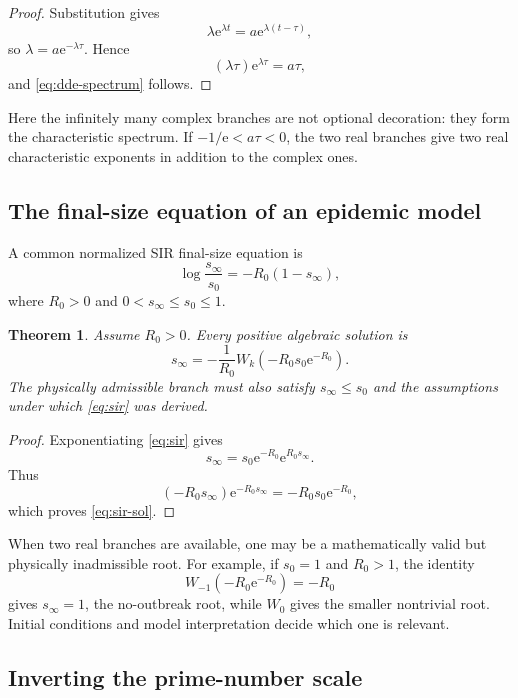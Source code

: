 \documentclass[11pt]{article}
\newtheorem{theorem}{Theorem}[section]
\theoremstyle{remark}
\newcommand{\ee}{\mathrm e}
\begin{document}
\begin{proof}
Substitution gives
\[
       \lambda\ee^{\lambda t}
       =a\ee^{\lambda(t-\tau)},
\]
so \(\lambda=a\ee^{-\lambda\tau}\).  Hence
\[
       (\lambda\tau)\ee^{\lambda\tau}=a\tau,
\]
and \eqref{eq:dde-spectrum} follows.
\end{proof}

Here the infinitely many complex branches are not optional decoration:
they form the characteristic spectrum.  If
\(-1/\ee<a\tau<0\), the two real branches give two real characteristic
exponents in addition to the complex ones.

\subsection{The final-size equation of an epidemic model}

A common normalized SIR final-size equation is
\begin{equation}\label{eq:sir}
       \log\frac{s_\infty}{s_0}
       =-R_0(1-s_\infty),
\end{equation}
where \(R_0>0\) and \(0<s_\infty\leq s_0\leq1\).

\begin{theorem}\label{thm:sir}
Assume \(R_0>0\).  Every positive algebraic solution is
\begin{equation}\label{eq:sir-sol}
       s_\infty
       =-\frac1{R_0}
       W_k(-R_0s_0\ee^{-R_0}).
\end{equation}
The physically admissible branch must also satisfy
\(s_\infty\leq s_0\) and the assumptions under which
\eqref{eq:sir} was derived.
\end{theorem}

\begin{proof}
Exponentiating \eqref{eq:sir} gives
\[
       s_\infty=s_0\ee^{-R_0}\ee^{R_0s_\infty}.
\]
Thus
\[
 (-R_0s_\infty)\ee^{-R_0s_\infty}
 =-R_0s_0\ee^{-R_0},
\]
which proves \eqref{eq:sir-sol}.
\end{proof}

When two real branches are available, one may be a mathematically valid but
physically inadmissible root.  For example, if \(s_0=1\) and \(R_0>1\),
the identity
\[
       W_{-1}(-R_0\ee^{-R_0})=-R_0
\]
gives \(s_\infty=1\), the no-outbreak root, while \(W_0\) gives the smaller
nontrivial root.  Initial conditions and model interpretation decide which
one is relevant.

\subsection{Inverting the prime-number scale}
\end{document}
